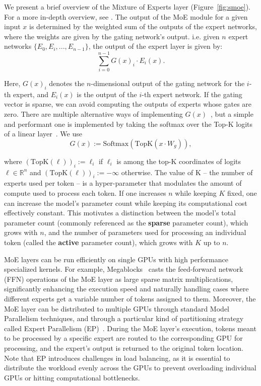 \documentclass{article}
\begin{document}
We present a brief overview of the Mixture of Experts layer (Figure~\ref{fig:smoe}). 
For a more in-depth overview, see \cite{fedus2022review}.
The output of the MoE module for a given input \( x \) is determined by the weighted sum of the outputs of the expert networks, where the weights are given by the gating network's output. i.e. given $n$ expert networks \(\{E_0, E_i, ..., E_{n-1}\}\), the output of the expert layer is given by:
\vspace{-5pt}
\[ \sum_{i=0}^{n-1} G(x)_i \cdot E_i(x). \]

Here, \( G(x)_i \) denotes the \(n\)-dimensional output of the gating network for the \(i\)-th expert, and \( E_i(x) \) is the output of the \(i\)-th expert network. If the gating vector is sparse, we can avoid computing the outputs of experts whose gates are zero. There are multiple alternative ways of implementing $G(x)$~\cite{clark2022unified,hazimeh2021dselect,zhou2022mixture}, but a simple and performant one is implemented by taking the softmax over the Top-K logits of a linear layer~\cite{shazeer2017outrageously}. We use
\[ G(x) := \text{Softmax}(\text{TopK}(x \cdot W_g)), \]

where $(\text{TopK}(\ell))_i := \ell_i$ if $\ell_i$ is among the top-K coordinates of logits $\ell \in \mathbb{R}^n$ and $(\text{TopK}(\ell))_i := -\infty$ otherwise. 
The value of K -- the number of experts used per token -- is a hyper-parameter that modulates the amount of compute used to process each token.
If one increases $n$ while keeping $K$ fixed, one can increase the model's parameter count while keeping its computational cost effectively constant.
This motivates a distinction between the model's total parameter count (commonly referenced as the \textbf{sparse} parameter count), which grows with $n$, and the number of parameters used for processing an individual token (called the \textbf{active} parameter count), which grows with $K$ up to $n$. 

MoE layers can be run efficiently on single GPUs with high performance specialized kernels. For example, Megablocks~\cite{gale2022megablocks} casts the feed-forward network (FFN) operations of the MoE layer as large sparse matrix multiplications, significantly enhancing the execution speed and naturally handling cases where different experts get a variable number of tokens assigned to them.
Moreover, the MoE layer can be distributed to multiple GPUs through standard Model Parallelism techniques, and through a particular kind of partitioning strategy called Expert Parallelism (EP)~\cite{shazeer2017outrageously}.
During the MoE layer's execution, tokens meant to be processed by a specific expert are routed to the corresponding GPU for processing, and the expert's output is returned to the original token location.
Note that EP introduces challenges in load balancing, as it is essential to distribute the workload evenly across the GPUs to prevent overloading individual GPUs or hitting computational bottlenecks.
\end{document}
